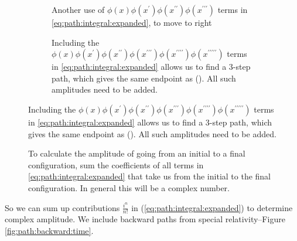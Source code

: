 \documentclass[]{article}
\begin{document}
\begin{figure}[H]
\begin{subfigure}[t]{0.45\textwidth}
	\end{subfigure}
	\begin{subfigure}[t]{0.45\textwidth}
		\caption{Another use of $\phi(x) \phi(x^\prime) \phi(x^{\prime\prime}) \phi(x^{\prime\prime\prime})$ terms in \eqref{eq:path:integral:expanded}, to move to right}\label{fig:path-integral8}
	\end{subfigure}
	\hfill
	\begin{subfigure}[t]{0.45\textwidth}
		\caption{Including the $\phi(x)\phi(x^\prime)\phi(x^{\prime\prime}) \phi(x^{\prime\prime\prime})\phi(x^{\prime\prime\prime\prime}) \phi(x^{\prime\prime\prime\prime\prime})$ terms in \eqref{eq:path:integral:expanded} allows us to find a 3-step path, which gives the same endpoint as  (). All such amplitudes need to be added.}\label{fig:path-integral9}
	\end{subfigure}
\end{figure}

\begin{figure}[H]
	\begin{center}
		\caption[Calculating the amplitude of going from an initial to a final configuration]{To calculate the amplitude of going from an initial to a final configuration, sum the coefficients of all terms in \eqref{eq:path:integral:expanded} that take us from the initial to the final configuration. In general this will be a complex number.}
	\end{center} 
\end{figure}
So we can sum up contributions $\frac{i^n}{n !}$ in (\ref{eq:path:integral:expanded}) to determine complex amplitude. We include backward paths from special relativity--Figure \ref{fig:path:backward:time}.
\end{document}
